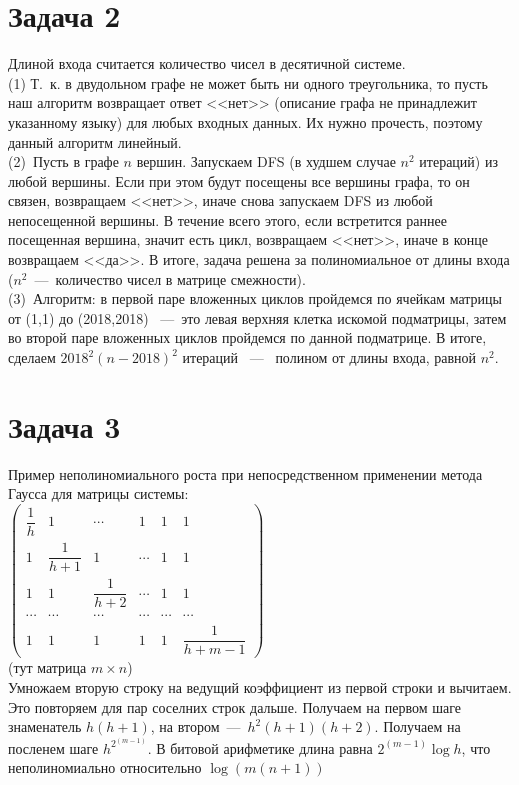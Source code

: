 \documentclass[a4paper,12pt]{article} %
\begin{document}
\section*{Задача 2}
Длиной входа считается количество чисел в десятичной системе.\\
(1)
Т.~к. в двудольном графе не может быть ни одного треугольника, то пусть наш алгоритм возвращает ответ <<нет>> (описание графа не принадлежит указанному языку) для любых входных данных. Их нужно прочесть, поэтому данный алгоритм линейный.\\

\noindent (2)~Пусть в графе $n$ вершин. Запускаем DFS (в худшем случае $n^2$ итераций) из любой вершины. Если при этом будут посещены все вершины графа, то он связен, возвращаем <<нет>>, иначе снова запускаем DFS из любой непосещенной вершины. В течение всего этого, если встретится раннее посещенная вершина, значит есть цикл, возвращаем <<нет>>, иначе в конце возвращаем <<да>>. В итоге, задача решена за полиномиальное от длины входа ($n^2$~---~количество чисел в матрице смежности).\\

\noindent(3)~Алгоритм: в первой паре вложенных циклов пройдемся по ячейкам матрицы от (1,1) до (2018,2018) ~---~это левая верхняя клетка искомой подматрицы, затем во второй паре вложенных циклов пройдемся по данной подматрице. В итоге, сделаем $2018^2(n-2018)^2$ итераций ~---~ полином от длины входа, равной $n^2$.


\section*{Задача 3}
Пример неполиномиального роста при непосредственном применении метода Гаусса для матрицы системы:\\
$
\begin{pmatrix}
\dfrac{1}{h} & 1 & \cdots & 1 &1&1\\
1& \dfrac{1}{h+1} & 1 & \cdots & 1&1\\
1& 1 & \dfrac{1}{h+2} & \cdots & 1&1\\
\cdots & \cdots & \cdots & \cdots & \cdots & \cdots \\
1&1&1&1&1&\dfrac{1}{h+m-1}
\end{pmatrix}
$ \\
(тут матрица $m\times n$)\\
Умножаем вторую строку на ведущий коэффициент из первой строки и вычитаем. Это повторяем для пар соселних строк дальше. Получаем на первом шаге знаменатель $h(h+1)$, на втором~---~$h^2(h+1)(h+2)$. Получаем на посленем шаге $h^{2^{(m-1)}}$. В битовой арифметике длина равна $2^{(m-1)}\log{h}$, что неполиномиально относительно $\log{(m(n+1))}$\\ 
\end{document}
